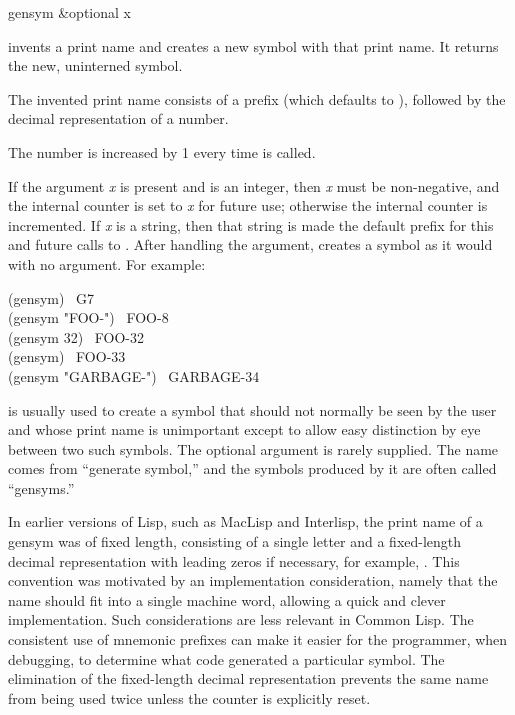 \begin{defun}[Function]
gensym &optional x

 invents a print name and creates a new symbol with that print name.
It returns the new, uninterned symbol.

The invented print name consists of a prefix
(which defaults to ), followed by the decimal representation of a number.
\begin{obsolete}
The number is increased by 1 every time  is called.

If the argument {\it x} is present and is an integer, then {\it x} must be
non-negative, and the internal counter is set to {\it x} for future use;
otherwise the internal counter is incremented.
If {\it x} is a string, then that string is made the default prefix
for this and future calls to .
After handling the argument,  creates a
symbol as it would with no argument.
For example:
\begin{lisp}
(gensym) \EV\ G7 \\
(gensym "FOO-") \EV\ FOO-8 \\
(gensym 32) \EV\ FOO-32 \\
(gensym) \EV\ FOO-33 \\
(gensym "GARBAGE-") \EV\ GARBAGE-34
\end{lisp}
\end{obsolete}

 is usually used to create a symbol that should not normally
be seen by the user and whose print name is unimportant except to
allow easy distinction by eye between two such symbols.
The optional argument is rarely supplied.
The name comes from ``generate symbol,'' and the symbols produced by it
are often called ``gensyms.''

\beforenoterule
\begin{incompatibility}
In earlier versions of Lisp, such as MacLisp and
Interlisp, the print name of a gensym was of fixed length, consisting
of a single letter and a fixed-length
decimal representation with leading zeros
if necessary, for example, .  This convention was
motivated by an implementation consideration, namely that the name
should fit into a single machine word, allowing a quick and clever
implementation.  Such considerations are less relevant in Common Lisp.
The consistent use of mnemonic prefixes can make it easier
for the programmer, when debugging, to determine what code generated
a particular symbol.  The elimination of the fixed-length decimal
representation prevents the same name from being used twice
unless the counter is explicitly reset.
\end{incompatibility}
\afternoterule


\end{defun}
